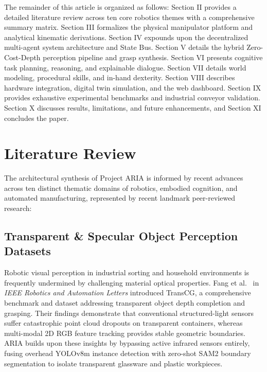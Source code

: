 \documentclass[journal]{IEEEtran}
\begin{document}
The remainder of this article is organized as follows: Section II provides a detailed literature review across ten core robotics themes with a comprehensive summary matrix. Section III formalizes the physical manipulator platform and analytical kinematic derivations. Section IV expounds upon the decentralized multi-agent system architecture and State Bus. Section V details the hybrid Zero-Cost-Depth perception pipeline and grasp synthesis. Section VI presents cognitive task planning, reasoning, and explainable dialogue. Section VII details world modeling, procedural skills, and in-hand dexterity. Section VIII describes hardware integration, digital twin simulation, and the web dashboard. Section IX provides exhaustive experimental benchmarks and industrial conveyor validation. Section X discusses results, limitations, and future enhancements, and Section XI concludes the paper.

\section{Literature Review}
The architectural synthesis of Project ARIA is informed by recent advances across ten distinct thematic domains of robotics, embodied cognition, and automated manufacturing, represented by recent landmark peer-reviewed research:

\subsection{Transparent \& Specular Object Perception Datasets}
Robotic visual perception in industrial sorting and household environments is frequently undermined by challenging material optical properties. Fang et al.~\cite{aria_131_fang_2022_transcg} in \textit{IEEE Robotics and Automation Letters} introduced TransCG, a comprehensive benchmark and dataset addressing transparent object depth completion and grasping. Their findings demonstrate that conventional structured-light sensors suffer catastrophic point cloud dropouts on transparent containers, whereas multi-modal 2D RGB feature tracking provides stable geometric boundaries. ARIA builds upon these insights by bypassing active infrared sensors entirely, fusing overhead YOLOv8m instance detection with zero-shot SAM2 boundary segmentation to isolate transparent glassware and plastic workpieces.
\end{document}
